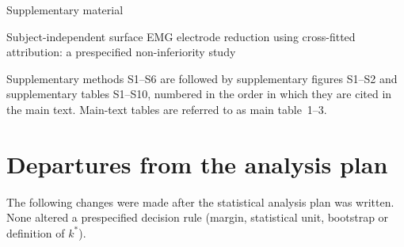 \documentclass{iopjournal}
\newif\ifshowchanges
\newcommand{\chg}[1]{\ifshowchanges{\color{blue}#1}\else{#1}\fi}
\begin{document}
{\noindent\fontsize{16}{19}\selectfont\sffamily Supplementary material\par}
\vspace{2mm}
{\noindent\large Subject-independent surface EMG electrode reduction using cross-fitted attribution: a prespecified non-inferiority study\par}
\vspace{6mm}

\chg{Supplementary methods S1--S6 are followed by supplementary figures S1--S2 and supplementary tables S1--S10, numbered in the order in which they are cited in the main text. Main-text tables are referred to as main table~1--3.}

\section{Departures from the analysis plan}
\label{app:deviations}
The following changes were made after the statistical analysis plan was written. None altered a prespecified decision rule (margin, statistical unit, bootstrap or definition of $k^*$).
\end{document}
